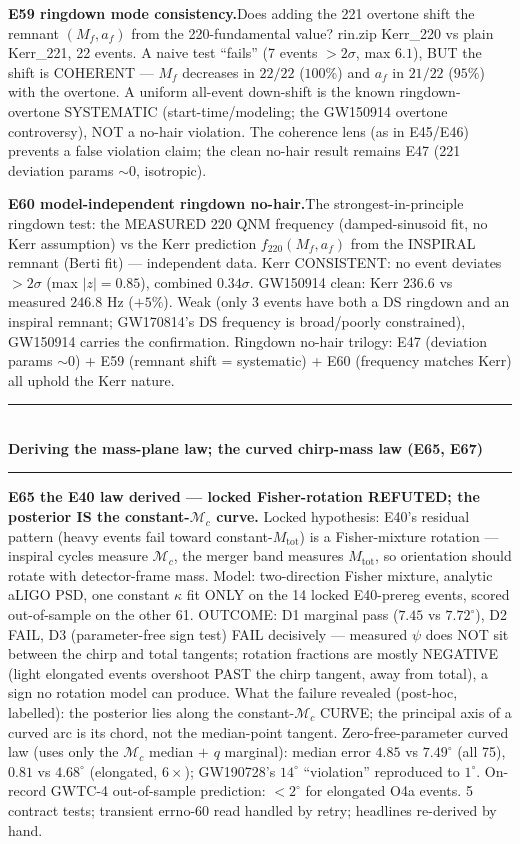 \documentclass[10pt]{article}
\newcommand{\entry}[2]{\vspace{5pt}\noindent\textbf{#1}\quad #2\par}
\newcommand{\grouphead}[1]{\vspace{9pt}\noindent\rule{\linewidth}{0.4pt}\\[-2pt]{\small\textbf{#1}}\\[-4pt]\rule{\linewidth}{0.4pt}\par\vspace{2pt}}
\begin{document}
\entry{E59 ringdown mode consistency.}{Does adding the 221 overtone shift the remnant $(M_f,a_f)$ from
the 220-fundamental value? rin.zip Kerr\_220 vs plain Kerr\_221, 22 events. A naive test ``fails'' (7
events $>2\sigma$, max $6.1$), BUT the shift is COHERENT --- $M_f$ decreases in $22/22$ ($100\%$) and
$a_f$ in $21/22$ ($95\%$) with the overtone. A uniform all-event down-shift is the known ringdown-
overtone SYSTEMATIC (start-time/modeling; the GW150914 overtone controversy), NOT a no-hair violation.
The coherence lens (as in E45/E46) prevents a false violation claim; the clean no-hair result remains
E47 (221 deviation params $\sim0$, isotropic).}

\entry{E60 model-independent ringdown no-hair.}{The strongest-in-principle ringdown test: the
MEASURED 220 QNM frequency (damped-sinusoid fit, no Kerr assumption) vs the Kerr prediction
$f_{220}(M_f,a_f)$ from the INSPIRAL remnant (Berti fit) --- independent data. Kerr CONSISTENT: no
event deviates $>2\sigma$ (max $|z|{=}0.85$), combined $0.34\sigma$. GW150914 clean: Kerr $236.6$ vs
measured $246.8$ Hz ($+5\%$). Weak (only 3 events have both a DS ringdown and an inspiral remnant;
GW170814's DS frequency is broad/poorly constrained), GW150914 carries the confirmation. Ringdown
no-hair trilogy: E47 (deviation params $\sim0$) + E59 (remnant shift = systematic) + E60 (frequency
matches Kerr) all uphold the Kerr nature.}

\grouphead{Deriving the mass-plane law; the curved chirp-mass law (E65, E67)}

\entry{E65 the E40 law derived --- locked Fisher-rotation REFUTED; the posterior IS the constant-$\mathcal{M}_c$ curve.}{
Locked hypothesis: E40's residual pattern (heavy events fail toward constant-$M_\mathrm{tot}$) is a
Fisher-mixture rotation --- inspiral cycles measure $\mathcal{M}_c$, the merger band measures
$M_\mathrm{tot}$, so orientation should rotate with detector-frame mass. Model: two-direction Fisher
mixture, analytic aLIGO PSD, one constant $\kappa$ fit ONLY on the 14 locked E40-prereg events,
scored out-of-sample on the other 61. OUTCOME: D1 marginal pass ($7.45$ vs $7.72^\circ$), D2 FAIL,
D3 (parameter-free sign test) FAIL decisively --- measured $\psi$ does NOT sit between the chirp and
total tangents; rotation fractions are mostly NEGATIVE (light elongated events overshoot PAST the
chirp tangent, away from total), a sign no rotation model can produce. What the failure revealed
(post-hoc, labelled): the posterior lies along the constant-$\mathcal{M}_c$ CURVE; the principal
axis of a curved arc is its chord, not the median-point tangent. Zero-free-parameter curved law
(uses only the $\mathcal{M}_c$ median $+$ $q$ marginal): median error $4.85$ vs $7.49^\circ$
(all 75), $\mathbf{0.81}$ vs $4.68^\circ$ (elongated, $6\times$); GW190728's $14^\circ$ ``violation''
reproduced to $1^\circ$. On-record GWTC-4 out-of-sample prediction: $<2^\circ$ for elongated O4a
events. 5 contract tests; transient errno-60 read handled by retry; headlines re-derived by hand.}
\end{document}
